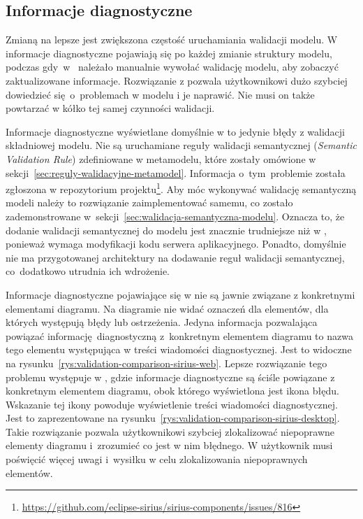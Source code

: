 \subsection{Informacje diagnostyczne}

Zmianą na lepsze jest zwiększona częstość uruchamiania walidacji
modelu. W \SiriusWeb{} informacje diagnostyczne pojawiają się po każdej
zmianie struktury modelu, podczas gdy~w~\SiriusDesktop{} należało
manualnie wywołać walidację modelu, aby zobaczyć zaktualizowane informacje.
Rozwiązanie z \SiriusWeb{} pozwala użytkownikowi dużo szybciej dowiedzieć
się~o~problemach w modelu i je naprawić. Nie musi on także powtarzać w kółko
tej samej czynności walidacji.

Informacje diagnostyczne wyświetlane domyślnie w \SiriusWeb{} to jedynie
błędy z walidacji składniowej modelu. Nie są uruchamiane reguły walidacji
semantycznej (\emph{Semantic Validation Rule}) zdefiniowane w metamodelu, które
zostały omówione w sekcji~\ref{sec:reguly-walidacyjne-metamodel}. Informacja
o~tym~problemie została zgłoszona w repozytorium projektu\footnote{
	\url{https://github.com/eclipse-sirius/sirius-components/issues/816}}.
Aby móc wykonywać walidację semantyczną modeli należy to rozwiązanie
zaimplementować samemu, co zostało zademonstrowane
w~sekcji~\ref{sec:walidacja-semantyczna-modelu}.
Oznacza to, że dodanie walidacji semantycznej do modelu jest znacznie
trudniejsze niż w \SiriusDesktop{}, ponieważ wymaga modyfikacji kodu
serwera aplikacyjnego. Ponadto, domyślnie nie ma przygotowanej architektury na
dodawanie reguł walidacji semantycznej, co~dodatkowo utrudnia ich wdrożenie.

Informacje diagnostyczne pojawiające się w \SiriusWeb{} nie są
jawnie związane z konkretnymi elementami diagramu. Na diagramie nie widać
oznaczeń dla elementów, dla których występują błędy lub ostrzeżenia. Jedyna
informacja pozwalająca powiązać informację diagnostyczną z~konkretnym elementem
diagramu to nazwa tego elementu występująca w treści wiadomości diagnostycznej.
Jest to widoczne na rysunku~\ref{rys:validation-comparison-sirius-web}. Lepsze
rozwiązanie tego problemu występuje w
\SiriusDesktop{}, gdzie informacje diagnostyczne są ściśle powiązane z
konkretnym elementem diagramu, obok którego wyświetlona jest ikona błędu.
Wskazanie tej ikony powoduje wyświetlenie treści wiadomości diagnostycznej.
Jest to zaprezentowane na
rysunku~\ref{rys:validation-comparison-sirius-desktop}.
Takie rozwiązanie pozwala użytkownikowi szybciej zlokalizować niepoprawne
elementy diagramu i~zrozumieć co jest w nim błędnego. W \SiriusWeb{}
użytkownik musi poświęcić więcej uwagi i~wysiłku w celu zlokalizowania
niepoprawnych elementów.

